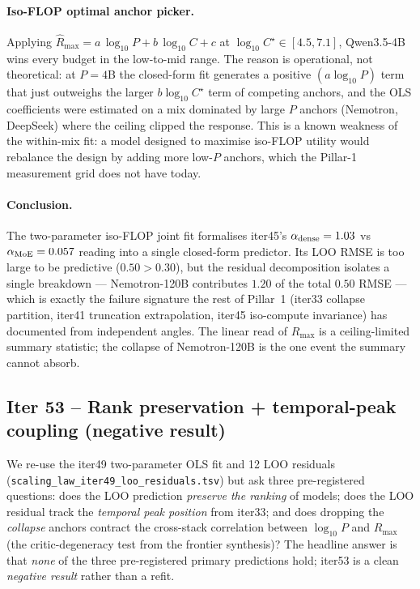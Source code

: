 \documentclass{article}
\begin{document}
\paragraph{Iso-FLOP optimal anchor picker.}
Applying $\hat{R}_{\max}=a\,\log_{10}P + b\,\log_{10}C + c$ at $\log_{10}C^{\star}\in[4.5,7.1]$, Qwen3.5-4B wins every budget in the low-to-mid range. The reason is operational, not theoretical: at $P=4$B the closed-form fit generates a positive $(a \log_{10} P)$ term that just outweighs the larger $b\log_{10}C^{\star}$ term of competing anchors, and the OLS coefficients were estimated on a mix dominated by large $P$ anchors (Nemotron, DeepSeek) where the ceiling clipped the response. This is a known weakness of the within-mix fit: a model designed to maximise iso-FLOP utility would rebalance the design by adding more low-$P$ anchors, which the Pillar-1 measurement grid does not have today.

\paragraph{Conclusion.}
The two-parameter iso-FLOP joint fit formalises iter45's $\alpha_{\rm dense}=1.03$ vs $\alpha_{\rm MoE}=0.057$ reading into a single closed-form predictor. Its LOO RMSE is too large to be predictive ($0.50 > 0.30$), but the residual decomposition isolates a single breakdown --- Nemotron-120B contributes $1.20$ of the total $0.50$ RMSE --- which is exactly the failure signature the rest of Pillar~1 (iter33 collapse partition, iter41 truncation extrapolation, iter45 iso-compute invariance) has documented from independent angles. The linear read of $R_{\max}$ is a ceiling-limited summary statistic; the collapse of Nemotron-120B is the one event the summary cannot absorb.
 \subsection{Iter 53 -- Rank preservation + temporal-peak coupling (negative result)}

We re-use the iter49 two-parameter OLS fit and 12 LOO residuals
(\texttt{scaling\_law\_iter49\_loo\_residuals.tsv}) but ask three pre-registered
questions: does the LOO prediction \emph{preserve the ranking} of models;
does the LOO residual track the \emph{temporal peak position} from iter33;
and does dropping the \emph{collapse} anchors contract the cross-stack
correlation between $\log_{10} P$ and $R_{\max}$ (the critic-degeneracy test
from the frontier synthesis)? The headline answer is that \emph{none} of the
three pre-registered primary predictions hold; iter53 is a clean
\emph{negative result} rather than a refit.
\end{document}
